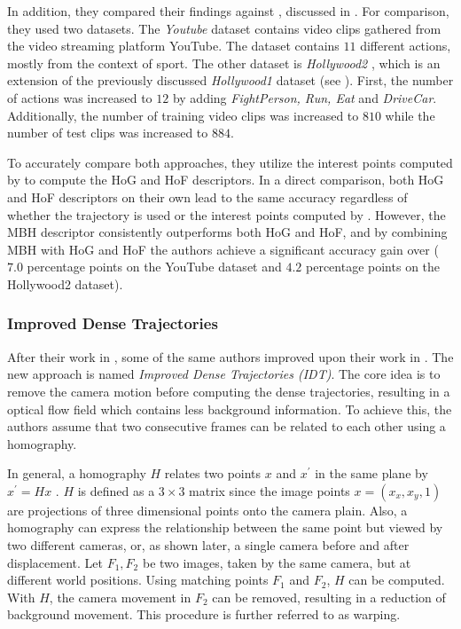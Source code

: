 In addition, they compared their findings against \cite{laptev_learning_2008}, discussed in .
For comparison, they used two datasets.
The \textit{Youtube} dataset \cite{liu_recognizing_2009} contains video clips gathered from the video streaming platform YouTube.
The dataset contains $11$ different actions, mostly from the context of sport.
The other dataset is \textit{Hollywood2} \cite{marszalek_actions_2009}, which is an extension of the previously discussed \textit{Hollywood1} dataset \cite{laptev_learning_2008} (see ).
First, the number of actions was increased to $12$ by adding \textit{FightPerson, Run, Eat} and \textit{DriveCar}.
Additionally, the number of training video clips was increased to $810$ while the number of test clips was increased to $884$. 

To accurately compare both approaches, they utilize the interest points computed by \cite{laptev_learning_2008} to compute the HoG and HoF descriptors.
In a direct comparison, both HoG and HoF descriptors on their own lead to the same accuracy regardless of whether the trajectory is used or the interest points computed by \cite{laptev_learning_2008}.
However, the MBH descriptor consistently outperforms both HoG and HoF, and by combining MBH with HoG and HoF the authors achieve a significant accuracy gain over \cite{laptev_learning_2008} ($7.0$ percentage points on the YouTube dataset and $4.2$ percentage points on the Hollywood2 dataset).

\subsubsection{Improved Dense Trajectories}
\label{sec:improved-dense-trajectories}
After their work in \cite{wang_dense_2013}, some of the same authors improved upon their work in \cite{wang_action_2013}.
The new approach is named \textit{Improved Dense Trajectories (IDT)}.
The core idea is to remove the camera motion before computing the dense trajectories, resulting in a optical flow field which contains less background information.
To achieve this, the authors assume that two consecutive frames can be related to each other using a homography.

In general, a homography $H$ relates two points $x$ and $x^\prime$ in the same plane by $x^\prime = Hx$ \cite{vincent_detecting_2001}.
$H$ is defined as a $3 \times 3$ matrix since the image points $x = (x_x, x_y, 1)$ are projections of three dimensional points onto the camera plain.
Also, a homography can express the relationship between the same point but viewed by two different cameras, or, as shown later, a single camera before and after displacement.
Let $F_1, F_2$ be two images, taken by the same camera, but at different world positions.
Using matching points $F_1$ and $F_2$, $H$ can be computed.
With $H$, the camera movement in $F_2$ can be removed, resulting in a reduction of background movement.
This procedure is further referred to as warping.

